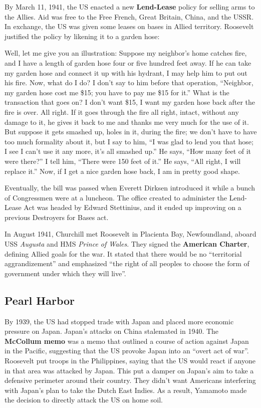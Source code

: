 By March 11, 1941, the US enacted a new \textbf{Lend-Lease} policy for selling arms to the Allies.
Aid was free to the Free French, Great Britain, China, and the USSR\@.
In exchange, the US was given some leases on bases in Allied territory.
Roosevelt justified the policy by likening it to a garden hose:
\begin{quoting}
  Well, let me give you an illustration:
  Suppose my neighbor's home catches fire, and I have a length of garden hose four or five hundred feet away.
  If he can take my garden hose and connect it up with his hydrant, I may help him to put out his fire.
  Now, what do I do?
  I don't say to him before that operation,
  ``Neighbor, my garden hose cost me \$15; you have to pay me \$15 for it.''
  What is the transaction that goes on?
  I don't want \$15, I want my garden hose back after the fire is over.
  All right.
  If it goes through the fire all right, intact, without any damage to it,
  he gives it back to me and thanks me very much for the use of it.
  But suppose it gets smashed up, holes in it, during the fire; we don't have to have too much formality about it,
  but I say to him, ``I was glad to lend you that hose; I see I can't use it any more, it's all smashed up.''
  He says, ``How many feet of it were there?''
  I tell him, ``There were 150 feet of it.''
  He says, ``All right, I will replace it.''
  Now, if I get a nice garden hose back, I am in pretty good shape.
\end{quoting}
Eventually, the bill was passed when Everett Dirksen introduced it while a bunch of Congressmen were at a luncheon.
The office created to administer the Lend-Lease Act was headed by Edward Stettinius,
and it ended up improving on a previous Destroyers for Bases act.

In August 1941, Churchill met Roosevelt in Placienta Bay, Newfoundland,
aboard USS \textit{Augusta} and HMS \textit{Prince of Wales}.
They signed the \textbf{American Charter}, defining Allied goals for the war.
It stated that there would be no ``territorial aggrandizement''
and emphasized ``the right of all peoples to choose the form of government under which they will live''.

\subsection*{Pearl Harbor}

By 1939, the US had stopped trade with Japan and placed more economic pressure on Japan.
Japan's attacks on China stalemated in 1940.
The \textbf{McCollum memo} was a memo that outlined a course of action against Japan in the Pacific,
suggesting that the US provoke Japan into an ``overt act of war''.
Roosevelt put troops in the Philippines, saying that the US would react if anyone in that area was attacked by Japan.
This put a damper on Japan's aim to take a defensive perimeter around their country.
They didn't want Americans interfering with Japan's plan to take the Dutch East Indies.
As a result, Yamamoto made the decision to directly attack the US on home soil.

